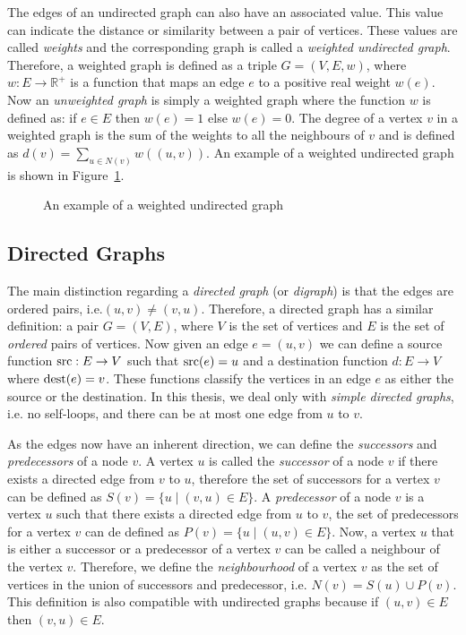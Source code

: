 The edges of an undirected graph can also have an associated value. This value can indicate the distance or similarity between a pair of vertices. These values are called \textit{weights} and the corresponding graph is called a \textit{weighted undirected graph}. Therefore, a weighted graph is defined as a triple $G=(V,E,w)$, where $w:E \rightarrow \mathbb{R}^{+}$ is a function that maps an edge $e$ to a positive real weight $w(e)$. Now an \textit{unweighted graph} is simply a weighted graph where the function $w$ is defined as: if $e \in E$ then $w(e)=1$ else $w(e)=0$. The degree of a vertex $v$ in a weighted graph is the sum of the weights to all the neighbours of $v$ and is defined as $d(v) = \sum_{u\in N(v)}w((u,v))$. An example of a weighted undirected graph is shown in Figure~\ref{fig:weighted-undirected}. 
\begin{figure}[!ht]
    \centering
    
    \caption{An example of a weighted undirected graph}
    \label{fig:weighted-undirected}
\end{figure}


\subsection{Directed Graphs}
The main distinction regarding a \textit{directed graph} (or \textit{digraph}) is that the edges are ordered pairs, i.e.$(u,v) \neq (v,u)$. Therefore, a directed graph has a similar definition: a pair $G=(V,E)$, where $V$ is the set of vertices and $E$ is the set of \textit{ordered} pairs of vertices. Now given an edge $e=(u,v)$ we can define a source function $\operatorname*{src}:E\rightarrow V$ such that $\operatorname*{src}(e)=u$ and a destination function $d:E\rightarrow V$ where $\operatorname*{dest}(e)=v$. These functions classify the vertices in an edge $e$ as either the source or the destination. In this thesis, we deal only with \textit{simple directed graphs}, i.e. no self-loops, and there can be at most one edge from $u$ to $v$. 

As the edges now have an inherent direction, we can define the \textit{successors} and \textit{predecessors} of a node $v$. A vertex $u$ is called the \textit{successor} of a node $v$ if there exists a directed edge from $v$ to $u$, therefore the set of successors for a vertex $v$ can be defined as $S(v) = \{u \mid (v,u) \in E\}$. A \textit{predecessor} of a node $v$ is a vertex $u$ such that there exists a directed edge from $u$ to $v$, the set of predecessors for a vertex $v$ can de defined as $P(v) = \{u \mid (u,v) \in E\}$. Now, a vertex $u$ that is either a successor or a predecessor of a vertex $v$ can be called a neighbour of the vertex $v$. Therefore, we define the \textit{neighbourhood} of a vertex $v$ as the set of vertices in the union of successors and predecessor, i.e. $N(v) = S(u) \cup P(v)$. This definition is also compatible with undirected graphs because if $(u,v) \in E$ then $(v,u) \in E$. 

